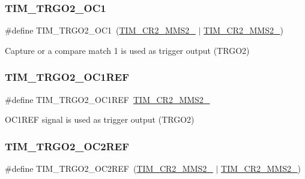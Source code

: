 \subsubsection{\texorpdfstring{TIM\_TRGO2\_OC1}{TIM\_TRGO2\_OC1}}
{\footnotesize\ttfamily \#define T\+I\+M\+\_\+\+T\+R\+G\+O2\+\_\+\+O\+C1~(\mbox{\hyperlink{group___peripheral___registers___bits___definition_ga0248e35956d0d22ac66dcd67aab317c5}{T\+I\+M\+\_\+\+C\+R2\+\_\+\+M\+M\+S2\+\_}} $\vert$ \mbox{\hyperlink{group___peripheral___registers___bits___definition_ga07efe60d8d7305b78085233ddaecb990}{T\+I\+M\+\_\+\+C\+R2\+\_\+\+M\+M\+S2\+\_}})}

Capture or a compare match 1 is used as trigger output (T\+R\+G\+O2) \mbox{\label{group___t_i_m___master___mode___selection__2_gabe44de11cdf3f6d151b0d4a4945db092}} 
\subsubsection{\texorpdfstring{TIM\_TRGO2\_OC1REF}{TIM\_TRGO2\_OC1REF}}
{\footnotesize\ttfamily \#define T\+I\+M\+\_\+\+T\+R\+G\+O2\+\_\+\+O\+C1\+R\+EF~\mbox{\hyperlink{group___peripheral___registers___bits___definition_gaa49670c71a446e5201994716b08b1527}{T\+I\+M\+\_\+\+C\+R2\+\_\+\+M\+M\+S2\+\_}}}

O\+C1\+R\+EF signal is used as trigger output (T\+R\+G\+O2) \mbox{\label{group___t_i_m___master___mode___selection__2_gaaa5b56f4c834853ccf048399f77fbb3b}} 
\subsubsection{\texorpdfstring{TIM\_TRGO2\_OC2REF}{TIM\_TRGO2\_OC2REF}}
{\footnotesize\ttfamily \#define T\+I\+M\+\_\+\+T\+R\+G\+O2\+\_\+\+O\+C2\+R\+EF~(\mbox{\hyperlink{group___peripheral___registers___bits___definition_gaa49670c71a446e5201994716b08b1527}{T\+I\+M\+\_\+\+C\+R2\+\_\+\+M\+M\+S2\+\_}} $\vert$ \mbox{\hyperlink{group___peripheral___registers___bits___definition_ga07efe60d8d7305b78085233ddaecb990}{T\+I\+M\+\_\+\+C\+R2\+\_\+\+M\+M\+S2\+\_}})}

